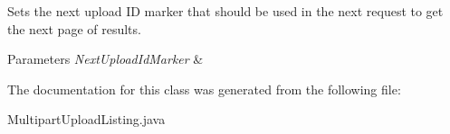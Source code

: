 Sets the next upload ID marker that should be used in the next request to get the next page of results. 


\begin{DoxyParams}{Parameters}
{\em Next\+Upload\+Id\+Marker} & \\
\hline
\end{DoxyParams}


The documentation for this class was generated from the following file\+:\begin{DoxyCompactItemize}
\item 
Multipart\+Upload\+Listing.\+java\end{DoxyCompactItemize}
